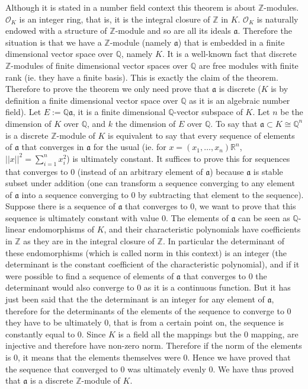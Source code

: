 \documentclass[12pt]{article}
\begin{document}
Although it is stated in a number field context this theorem is about $\mathbb Z$-modules. $\mathcal{O}_K$ is an integer ring, that is, it is the integral closure of $\mathbb Z$ in $K$.
 $\mathcal{O}_K$ is naturally endowed with a structure of $\mathbb Z$-module and so are all its ideals $\mathfrak a$. Therefore the situation is that we have a $\mathbb Z$-module (namely $\mathfrak a$) that is embedded in a finite dimensional vector space over $\mathbb Q$, namely $K$. It is a well-known fact that discrete $\mathbb Z$-modules of finite dimensional vector spaces over $\mathbb Q$ are free modules with finite rank (ie. they have a finite basis). This is exactly the claim of the theorem.\\
Therefore to prove the theorem we only need prove that $\mathfrak a$ is discrete ($K$ is by definition a finite dimensional vector space over $\mathbb Q$ as it is an algebraic number field).
 Let $E:={\mathbb Q}{\mathfrak a}$, it is a finite dimensional $\mathbb Q$-vector subspace of $K$. Let $n$ be the dimension of $K$ over $\mathbb Q$, and $k$ the dimension of $E$ over $\mathbb Q$.
 To say that $\mathfrak a \subset K\cong {\mathbb Q}^n$ is a discrete $\mathbb Z$-module of $K$ is equivalent to say that every sequence of elements of $\mathfrak a$ that converges in $\mathfrak a$ for the usual  (ie. for $x=(x_1,\ldots,x_n){\mathbb R}^n$, $||x||^2=\sum_{i=1}^{n} x_i^2$) is ultimately constant. It suffices to prove this for sequences that converges to $0$ (instead of an arbitrary element of $\mathfrak a$) because $\mathfrak a$ is stable subset under addition (one can transform a sequence converging to any element of $\mathfrak a$ into a sequence converging to $0$ by subtracting that element to the sequence).\\
Suppose there is a sequence of $\mathfrak a$ that converges to $0$, we want to prove that this sequence is ultimately constant with value $0$. The elements of $\mathfrak a$ can be seen as $\mathbb Q$-linear endomorphisms of $K$, and their characteristic polynomials have coefficients in $\mathbb Z$ as they are in the integral closure of $\mathbb Z$.
 In particular the determinant of these endomorphisms (which is called norm in this context) is an integer (the determinant is the constant coefficient of the characteristic polynomial), and if it were possible to find a sequence of elements of ${\mathfrak a}$ that converges to $0$ the determinant would also converge to $0$ as it is a continuous function. But it has just been said that the the determinant is an integer for any element of $\mathfrak a$, therefore for the determinants of the elements of the sequence to converge to $0$ they have to be ultimately $0$, that is from a certain point on, the sequence is constantly equal to $0$.
 Since $K$ is a field all the mappings but the $0$ mapping, are injective and therefore have non-zero norm. Therefore if the norm of the elements is $0$, it means that the elements themselves were $0$. Hence we have proved that the sequence that converged to $0$ was ultimately evenly $0$. We have thus proved that $\mathfrak a$ is a discrete $\mathbb Z$-module of $K$.
\end{document}
